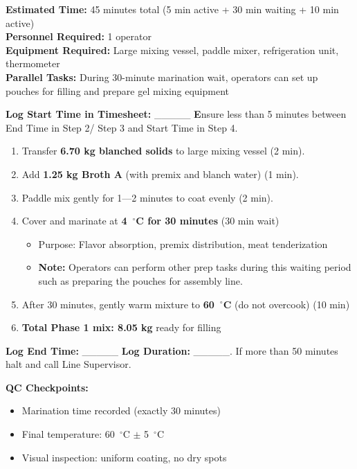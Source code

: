 {\textbf{Estimated Time:} 45 minutes total (5 min active + 30 min waiting + 10 min active) \\
\textbf{Personnel Required:} 1 operator \\
\textbf{Equipment Required:} Large mixing vessel, paddle mixer, refrigeration unit, thermometer \\
\textbf{Parallel Tasks:} During 30-minute marination wait, operators can set up pouches for filling and prepare gel mixing equipment

\textbf{Log Start Time in Timesheet:} \_\_\_\_\_
\textbf Ensure less than 5 minutes between End Time in Step 2/ Step 3 and Start Time in Step 4. 
\begin{enumerate}[leftmargin=1.5em]
\item Transfer \textbf{6.70 kg blanched solids} to large mixing vessel (2 min).
\item Add \textbf{1.25 kg Broth A} (with premix and blanch water) (1 min).
\item Paddle mix gently for 1---2 minutes to coat evenly (2 min).
\item Cover and marinate at \textbf{4~$^\circ$C for 30 minutes} (30 min wait)
  \begin{itemize}
  \item Purpose: Flavor absorption, premix distribution, meat tenderization
  \item \textbf{Note:} Operators can perform other prep tasks during this waiting period such as preparing the pouches for assembly line.
\end{itemize}
\item After 30 minutes, gently warm mixture to \textbf{60~$^\circ$C} (do not overcook) (10 min)
\item \textbf{Total Phase 1 mix: 8.05 kg} ready for filling
\end{enumerate}
\textbf{Log End Time:} \_\_\_\_\_
\textbf{Log Duration:} \_\_\_\_\_.
If more than 50 minutes halt and call Line Supervisor.

\textbf{QC Checkpoints:}
\begin{itemize}
\item Marination time recorded (exactly 30 minutes)
\item Final temperature: 60~$^\circ$C $\pm$ 5~$^\circ$C
\item Visual inspection: uniform coating, no dry spots
\end{itemize}

}
